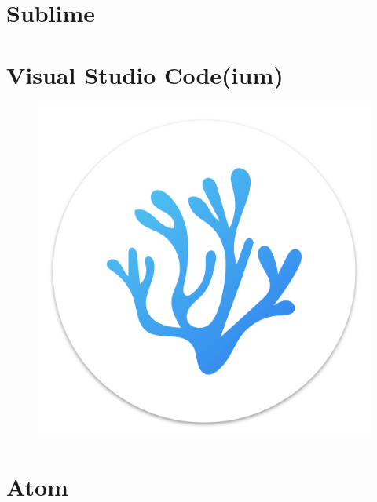 \lipsum[1]
\begin{figure}
	
\end{figure}
\lipsum[1]

\section{Sublime}

\lipsum[1]
\begin{figure}
	
\end{figure}
\lipsum[1]

\section{Visual Studio Code(ium)}

\lipsum[1]
\begin{figure}
\includegraphics[width=0.19\paperwidth]{./img/editors/vscodium}
\end{figure}
\lipsum[1]

\section{Atom}

